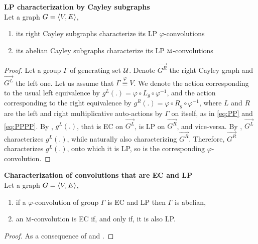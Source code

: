 \begin{theorem}\textbf{LP characterization by Cayley subgraphs}\\
Let a graph $G = \langle V, E \rangle$,
\begin{enumerate}[nolistsep,noitemsep,label=(\roman*)]
\item its right Cayley subgraphs characterize its LP $\varphi$-convolutions
\item its abelian Cayley subgraphs characterize its LP $\operatorname{\textsc{m}}$-convolutions
\end{enumerate}
\label{th:cayleycharLP}
\end{theorem}
\begin{proof}
Let a group $\Gamma$ of generating set $\mathcal{U}$. Denote $\vec{G^R}$ the right Cayley graph and $\vec{G^L}$ the left one. Let us assume that $\Gamma \overset\varphi\equiv V$. We denote the action corresponding to the usual left equivalence by $g^L(.) = \varphi \circ L_g \circ \varphi^{-1}$, and the action corresponding to the right equivalence by $g^R(.) = \varphi \circ R_g \circ \varphi^{-1}$, where $L$ and $R$ are the left and right multiplicative auto-actions by $\Gamma$ on itself, as in \eqref{eq:PP} and \eqref{eq:PPPP}. By , $g^L(.)$, that is EC on $\vec{G^L}$, is LP on $\vec{G^R}$, and vice-versa. By , $\vec{G^L}$ characterizes $g^L(.)$, while naturally also characterizing $\vec{G^R}$. Therefore, $\vec{G^R}$ characterizes $g^L(.)$, onto which it is LP, so is the corresponding $\varphi$-convolution.
\end{proof}

\begin{corollary}\textbf{Characterization of convolutions that are EC and LP}\\
Let a graph $G = \langle V, E \rangle$, 
\begin{enumerate}[nolistsep,noitemsep,label=(\roman*)]
\item if a $\varphi$-convolution of group $\Gamma$ is EC and LP then $\Gamma$ is abelian,
\item an $\operatorname{\textsc{m}}$-convolution is EC if, and only if, it is also LP.
\end{enumerate}
\label{cor:cayleycharECLP}
\end{corollary}
\begin{proof}
As a consequence of  and .
\end{proof}

